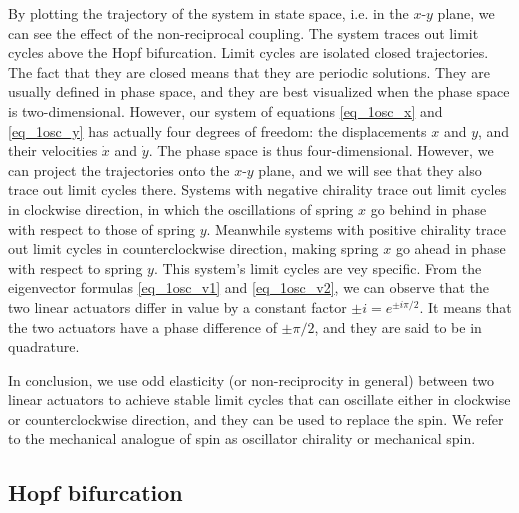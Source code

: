 \documentclass[11pt, a4paper]{article} %
\newcommand{\xd}{\dot{x}}
\newcommand{\yd}{\dot{y}}
\begin{document}
    By plotting the trajectory of the system in state space, i.e. in the $x$-$y$ plane, we can see the effect of the non-reciprocal coupling.
    The system traces out limit cycles above the Hopf bifurcation. Limit cycles are isolated closed trajectories. 
    The fact that they are closed means that they are periodic solutions. They are usually defined in phase space, 
    and they are best visualized when the phase space is two-dimensional. However, our system 
    of equations \eqref{eq_1osc_x} and \eqref{eq_1osc_y} has actually four degrees of freedom: 
    the displacements $x$ and $y$, and their velocities $\xd$ and $\yd$. The phase space is thus four-dimensional.
    However, we can project the trajectories onto the $x$-$y$ plane, and we will see that they also trace out limit cycles there.
    Systems with negative chirality trace out limit cycles in clockwise direction, in which the oscillations of 
    spring $x$ go behind in phase with respect to those of spring $y$.
    Meanwhile systems with positive chirality trace out limit cycles in counterclockwise direction,
    making spring $x$ go ahead in phase with respect to spring $y$. 
    This system's limit cycles are vey specific. From the eigenvector formulas \eqref{eq_1osc_v1} and \eqref{eq_1osc_v2}, 
    we can observe that the two linear actuators differ in value by a constant factor $\pm i = e^{\pm i\pi/2}$. 
    It means that the two actuators have a phase difference of $\pm \pi/2$, and they are said to be in quadrature. 


    In conclusion, we use odd elasticity (or non-reciprocity in general) between two linear actuators to achieve stable limit cycles 
    that can oscillate either in clockwise or counterclockwise direction, and they can be used to replace the spin. We refer to the 
    mechanical analogue of spin as oscillator chirality or mechanical spin. 

\subsection{Hopf bifurcation}
\label{subsec:1unit_hopf}
\end{document}
